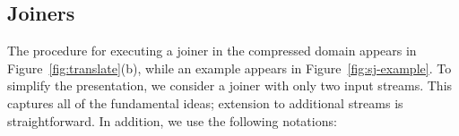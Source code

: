 \subsection{Joiners}


The procedure for executing a joiner in the compressed domain appears
in Figure~\ref{fig:translate}(b), while an example appears in
Figure~\ref{fig:sj-example}.  To simplify the presentation, we
consider a joiner with only two input streams.  This captures all of
the fundamental ideas; extension to additional streams is
straightforward.  In addition, we use the following notations:

\begin{figure*}[t]
\hspace{-0.04\textwidth}

\vspace{-10pt}
\caption{Example filter, splitter, and joiner in StreamIt.  The
  splitter and joiner combine to form a Transpose. Translation to the
  compressed domain is illustrated in Figures~\ref{fig:filter-example}
  and~\ref{fig:sj-example}.\protect\label{fig:streamit-example}}
\vspace{1pt}
\end{figure*}

\begin{figure*}[t]
\hspace{-0.045\textwidth}

\vspace{-10pt}
\caption{Example execution of a filter in the uncompressed and
  compressed domains.  See Figure~\ref{fig:streamit-example}(a) for the
  source filter.\protect\label{fig:filter-example}}
\vspace{-6pt}
\end{figure*}

